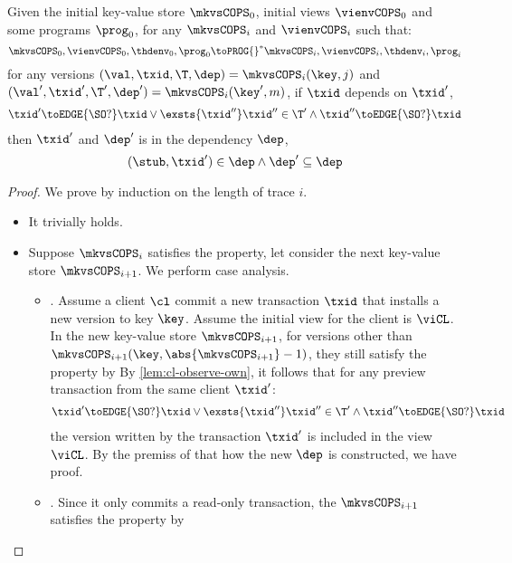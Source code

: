 \begin{lemma}
    \label{lem:cops-dep}
    Given the initial key-value store \( \mkvsCOPS_0 \), initial views \( \vienvCOPS_0 \) and some programs \( \prog_0 \), for any \( \mkvsCOPS_i \) and \( \vienvCOPS_i \)  such that: 
    \[
        \mkvsCOPS_0, \vienvCOPS_0, \thdenv_0, \prog_0 {\toPROG{}}^* \mkvsCOPS_i, \vienvCOPS_i, \thdenv_i, \prog_i 
    \]
    for any versions \( ( \val,\txid,\T,\dep ) = \mkvsCOPS_i(\key,j) \) and \( ( \val',\txid',\T',\dep' ) = \mkvsCOPS_i(\key',m) \), if \( \txid \) depends on \( \txid' \), \ie
    \[
        \begin{array}{@{}l@{}}
            \txid' \toEDGE{\SO ?} \txid
            \lor \exsts{\txid''}
            \txid'' \in \T' \land
            \txid'' \toEDGE{\SO ?} \txid
        \end{array}
    \]
    then \( \txid' \) and \( \dep' \) is in the dependency \( \dep \), \ie
    \[
        (\stub, \txid') \in \dep \land \dep' \subseteq \dep
    \]
\end{lemma}
\begin{proof}
    We prove by induction on the length of trace \( i \).
    \begin{itemize}
        \item 
        It trivially holds.
        \item  
        Suppose \( \mkvsCOPS_i \) satisfies the property, let consider the next key-value store \( \mkvsCOPS_{i+1}\).
        We perform case analysis.
        \begin{itemize}
            \item 
            .
            Assume a client \( \cl \) commit a new transaction \( \txid \) that installs a new version to key \( \key \).
            Assume the initial view for the client is \( \viCL \).
            In the new key-value store \( \mkvsCOPS_{i+1} \), for versions other than \( \mkvsCOPS_{i+1}(\key, \abs{\mkvsCOPS_{i+1}} - 1 ) \), they still satisfy the property by \ih
            By \cref{lem:cl-observe-own}, it follows that for any preview transaction from the same client \( \txid' \):
            \[
                \begin{array}{@{}l@{}}
                    \txid' \toEDGE{\SO ?} \txid
                    \lor \exsts{\txid''}
                    \txid'' \in \T' \land
                    \txid'' \toEDGE{\SO ?} \txid
                \end{array}
            \]
            the version written by the transaction \( \txid' \) is included in the view \( \viCL \).
            By the premiss of  that how the new \( \dep \) is constructed, we have proof.

            \item 
            .
            Since it only commits a read-only transaction, 
            the \( \mkvsCOPS_{i+1} \)  satisfies the property by \ih
        \end{itemize}
    \end{itemize}
\end{proof}

